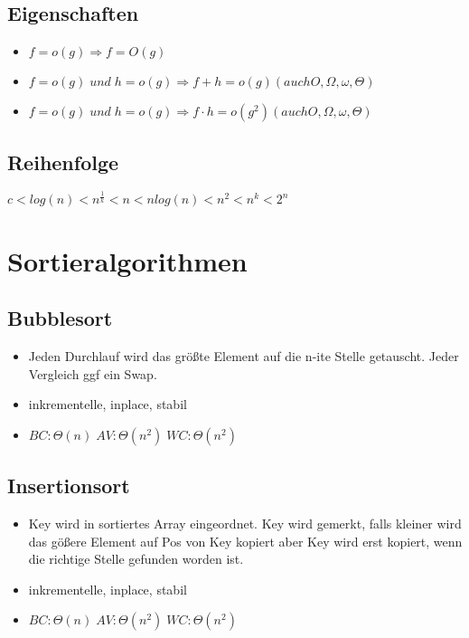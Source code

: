 \documentclass{article}
\begin{document}
\subsection{Eigenschaften}
\begin{itemize}
\item $f = o(g) \Rightarrow f = O(g)$
\item $f = o(g) \; und \;  h = o(g) \Rightarrow f+h = o(g) (auch O, \Omega, \omega, \Theta)$
\item $f = o(g) \; und \;  h = o(g) \Rightarrow f\cdot h = o(g^2) (auch O, \Omega, \omega, \Theta)$
\end{itemize}
\subsection{Reihenfolge}
$c < log(n) < n^{\frac{1}{k}} < n < n log(n) < n^2 < n^k < 2^n$
\section{Sortieralgorithmen}
\subsection {Bubblesort}
\begin{itemize}
\item Jeden Durchlauf wird das größte Element auf die n-ite Stelle getauscht. Jeder Vergleich ggf ein Swap.
\item inkrementelle, inplace, stabil
\item $BC: \Theta(n)\; AV: \Theta(n^2) \; WC: \Theta(n^2)$
\end{itemize}

\subsection{Insertionsort}
\begin{itemize}
\item Key wird in sortiertes Array eingeordnet. Key wird gemerkt, falls kleiner wird das gö\ss ere Element auf Pos von Key kopiert aber Key wird erst kopiert, wenn die richtige Stelle gefunden worden ist.
\item inkrementelle, inplace, stabil
\item $BC: \Theta(n)\; AV: \Theta(n^2) \; WC: \Theta(n^2)$ 
\end{itemize}
\end{document}
